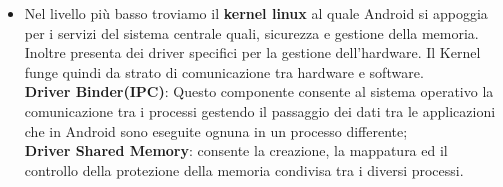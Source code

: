 \begin{itemize}
\item Nel livello più basso troviamo il \textbf{kernel linux} al quale Android si appoggia per i servizi del sistema centrale quali, sicurezza e gestione della memoria. Inoltre presenta dei driver specifici per la gestione dell'hardware. Il Kernel funge quindi da strato di comunicazione tra hardware e software.
\\\textbf{Driver Binder(IPC)}: Questo componente consente al sistema operativo la comunicazione tra i processi gestendo il passaggio dei dati tra le applicazioni che in Android sono eseguite ognuna in un processo differente;
\\\textbf{Driver Shared Memory}: consente la creazione, la mappatura ed il controllo della protezione della memoria condivisa tra i diversi processi. 


\end{itemize}

